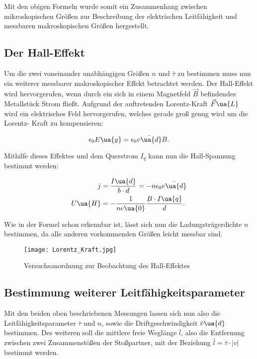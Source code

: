 Mit den obigen Formeln wurde somit ein Zusammenhang zwischen mikroskopischen Größen
zur Beschreibung der elektrischen Leitfähigkeit und messbaren makroskopischen
Größen hergestellt.

\subsection{Der Hall-Effekt}

Um die zwei voneinander unabhängigen Größen $n$ und $\bar{\tau}$ zu bestimmen muss
nun ein weiterer messbarer makroskopischer Effekt betrachtet werden. Der Hall-Effekt
wird hervorgerufen, wenn durch ein sich in einem Magnetfeld $\vec{B}$ befindendes
Metallstück Strom fließt. Aufgrund der auftretenden Lorentz-Kraft $\vec{F}\ua{L}$
wird ein elektrisches Feld hervorgerufen, welches gerade groß genug wird um die Lorentz-
Kraft zu kompensieren:

\begin{equation}
  \epsilon_0E\ua{y} = \epsilon_0\bar{v\ua{d}}B.
\end{equation}

Mithilfe dieses Effektes und dem Querstrom $I_q$ kann nun die Hall-Spannung bestimmt
werden:

\begin{align}
  j         &= \frac{I\ua{d}}{b\cdot d} = - n \epsilon_0 \bar{v\ua{d}} \\
  U\ua{H}   &= - \frac{1}{ne\ua{0}} \frac{B \cdot I\ua{q}}{d} .
  \label{eqn:Hall_Spannung}
\end{align}

Wie in der Formel schon erkennbar ist, lässt sich nun die Ladungsträgerdichte $n$
bestimmen, da alle anderen vorkommenden Größen leicht messbar sind.

\begin{figure}
  \centering
  \texttt{[image: Lorentz\_Kraft.jpg]}
  \caption{Versuchsanordnung zur Beobachtung des Hall-Effektes \cite{anleitung01}}
  \label{}
\end{figure}

\subsection{Bestimmung weiterer Leitfähigkeitsparameter}

Mit den beiden oben beschriebenen Messungen lassen sich nun also die Leitfähigkeitsparameter
$\bar{\tau}$ und $n$, sowie die Driftgeschwindigkeit $\bar{v}\ua{d}$ bestimmen.
Des weiteren soll die mittlere freie Weglänge $\bar{l}$, also die Entfernung
zwischen zwei Zusammenstößen der Stoßpartner, mit der Beziehung $\bar{l} = \bar{\tau} \cdot |v|$
bestimmt werden.

